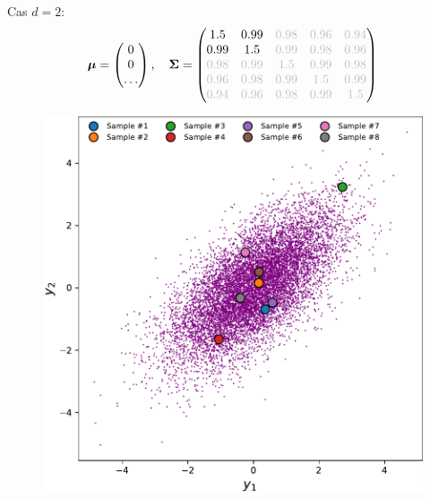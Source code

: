 \documentclass[xcolor=svgnames, t]{beamer}
\newcommand{\vectorx}[1]{\boldsymbol{\MakeLowercase{\mathbf{#1}}}}
\newcommand{\matrixx}[1]{\boldsymbol{\MakeUppercase{#1}}}
\begin{document}
\begin{frame}{\subsecname}
  Cas $d=2$:
  \begin{equation*}
    \vectorx{\mu}
    =
    \begin{pmatrix}
      0 \\
      0 \\
      \dots
    \end{pmatrix},
    \quad
    \matrixx{\Sigma}
    =
    \begin{pmatrix}
      1.5 & 0.99 & \color{lightgray}0.98 & \color{lightgray}0.96 & \color{lightgray}0.94 \\
      0.99 & 1.5 & \color{lightgray}0.99 & \color{lightgray}0.98 & \color{lightgray}0.96 \\
      \color{lightgray}0.98 & \color{lightgray}0.99 & \color{lightgray}1.5 & \color{lightgray}0.99 & \color{lightgray}0.98 \\
      \color{lightgray}0.96 & \color{lightgray}0.98 & \color{lightgray}0.99 & \color{lightgray}1.5 & \color{lightgray}0.99 \\
      \color{lightgray}0.94 & \color{lightgray}0.96 & \color{lightgray}0.98 & \color{lightgray}0.99 & \color{lightgray}1.5
      \end{pmatrix}
  \end{equation*}
  \begin{figure}[ht]
    \includegraphics[scale=0.3]{gaussian_2d_2outof5.pdf}

\end{figure}
\end{frame}
\end{document}
